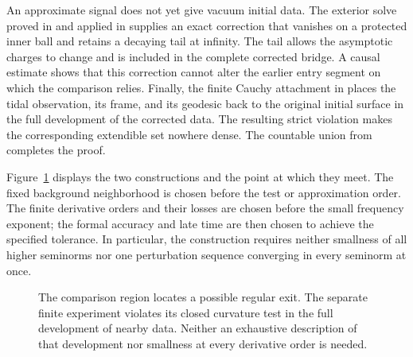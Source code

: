 An approximate signal does not yet give vacuum initial data.
The exterior solve proved in  and applied in
 supplies an exact correction that vanishes on a
protected inner ball and retains a decaying tail at infinity. The tail
allows the asymptotic charges to change and is included in the complete
corrected bridge. A causal estimate shows that this correction cannot
alter the earlier entry segment on which the comparison relies.
Finally, the finite Cauchy attachment in  places the
tidal observation, its frame, and its geodesic back to the original
initial surface in the full development of the corrected data.
The resulting strict violation makes the corresponding extendible
set nowhere dense. The countable union from 
completes the proof.

Figure~\ref{fig:proof} displays the two constructions and the point
at which they meet. The fixed background neighborhood is chosen before
the test or approximation order. The finite derivative orders and
their losses are chosen before the small frequency exponent; the
formal accuracy and late time are then chosen to achieve the specified
tolerance. In particular, the construction requires neither smallness
of all higher seminorms nor one perturbation sequence converging in
every seminorm at once.

\begin{figure}[htbp]
\centering
{}
\caption{The comparison region locates a possible regular exit. The
separate finite experiment violates its closed curvature test in the
full development of nearby data. Neither an exhaustive description
of that development nor smallness at every derivative order is needed.}
\label{fig:proof}
\end{figure}

